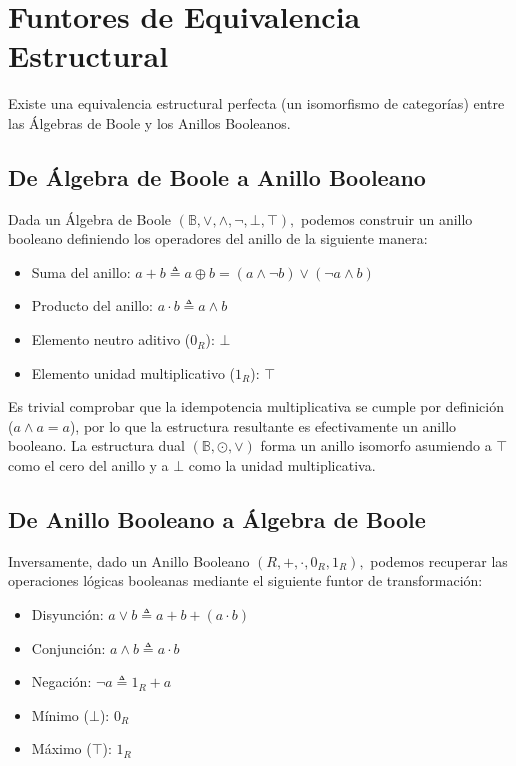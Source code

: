 \section{Funtores de Equivalencia Estructural}

Existe una equivalencia estructural perfecta (un isomorfismo de categorías) entre las Álgebras de Boole y los Anillos Booleanos.

\subsection{De Álgebra de Boole a Anillo Booleano}
Dada un Álgebra de Boole $(\mathbb{B}, \vee, \wedge, \neg, \bot, \top),$ podemos construir un anillo booleano definiendo los operadores del anillo de la siguiente manera:
\begin{itemize}
    \item Suma del anillo: $a + b \triangleq a \oplus b = (a \wedge \neg b) \vee (\neg a \wedge b)$
    \item Producto del anillo: $a \cdot b \triangleq a \wedge b$
    \item Elemento neutro aditivo ($0_R$): $\bot$
    \item Elemento unidad multiplicativo ($1_R$): $\top$
\end{itemize}
Es trivial comprobar que la idempotencia multiplicativa se cumple por definición ($a \wedge a = a$), por lo que la estructura resultante es efectivamente un anillo booleano. La estructura dual $(\mathbb{B}, \odot, \vee)$ forma un anillo isomorfo asumiendo a $\top$ como el cero del anillo y a $\bot$ como la unidad multiplicativa.

\subsection{De Anillo Booleano a Álgebra de Boole}
Inversamente, dado un Anillo Booleano $(R, +, \cdot, 0_R, 1_R),$ podemos recuperar las operaciones lógicas booleanas mediante el siguiente funtor de transformación:
\begin{itemize}
    \item Disyunción: $a \vee b \triangleq a + b + (a \cdot b)$
    \item Conjunción: $a \wedge b \triangleq a \cdot b$
    \item Negación: $\neg a \triangleq 1_R + a$
    \item Mínimo ($\bot$): $0_R$
    \item Máximo ($\top$): $1_R$
\end{itemize}

